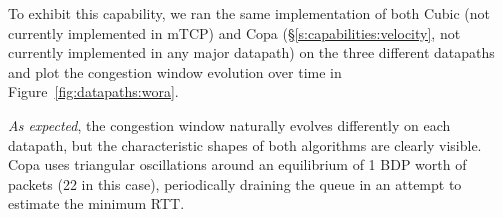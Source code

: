
To exhibit this capability, we ran the same implementation of both Cubic (not currently implemented in mTCP) and Copa (\S\ref{s:capabilities:velocity}, not currently implemented in any major datapath) on the three different datapaths and plot the congestion window evolution over time in Figure~\ref{fig:datapaths:wora}.

\textit{As expected}, the congestion window naturally evolves differently on each datapath, but the characteristic shapes of both algorithms are clearly visible. Copa uses triangular oscillations around an equilibrium of 1 BDP worth of packets (22 in this case), periodically draining the queue in an attempt to estimate the minimum RTT.



%
%
%
%
%
